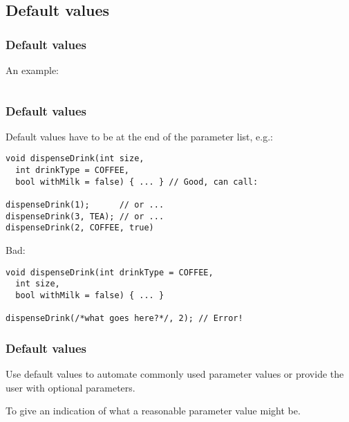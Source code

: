 \documentclass{beamer}
\begin{document}
\subsection{Default values}

\begin{frame}[fragile]
  \frametitle{Default values}
	An example:
	
  \begin{columns}[t]
    \begin{column}[T]{0.48\textwidth}
      
    \end{column}
    \begin{column}[T]{0.48\textwidth}
  
	  \end{column}
	\end{columns}
\end{frame}

\begin{frame}[fragile]
  \frametitle{Default values}
  
  Default values have to be at the end of the parameter list, e.g.:
  \begin{lstlisting}
void dispenseDrink(int size,
  int drinkType = COFFEE,
  bool withMilk = false) { ... } // Good, can call:
  
dispenseDrink(1);      // or ...
dispenseDrink(3, TEA); // or ...
dispenseDrink(2, COFFEE, true)
  \end{lstlisting}
  \pause
  Bad:
  \begin{lstlisting}
void dispenseDrink(int drinkType = COFFEE,
  int size,
  bool withMilk = false) { ... }
  
dispenseDrink(/*what goes here?*/, 2); // Error!
  \end{lstlisting}
\end{frame}

\begin{frame}[fragile]
  \frametitle{Default values}
  
  \begin{doblocke}
    \begin{doitemize}
      \item{Use default values to automate commonly used parameter values or provide the user with optional parameters.}
      \pause
      \item{To give an indication of what a reasonable parameter value might be.}
    \end{doitemize}
  \end{doblocke}
\end{frame}
\end{document}
